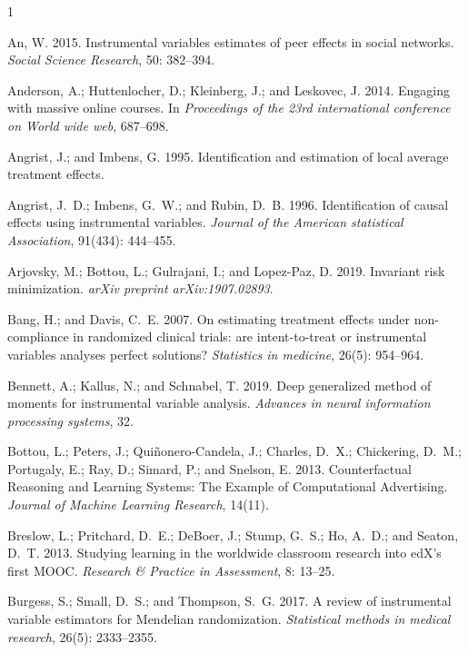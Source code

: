 \documentclass[journal]{IEEEtran}
\begin{document}
\begin{thebibliography}{1}

An, W. 2015.
\newblock Instrumental variables estimates of peer effects in social networks.
\newblock \emph{Social Science Research}, 50: 382--394.

Anderson, A.; Huttenlocher, D.; Kleinberg, J.; and Leskovec, J. 2014.
\newblock Engaging with massive online courses.
\newblock In \emph{Proceedings of the 23rd international conference on World wide web}, 687--698.

Angrist, J.; and Imbens, G. 1995.
\newblock Identification and estimation of local average treatment effects.

Angrist, J.~D.; Imbens, G.~W.; and Rubin, D.~B. 1996.
\newblock Identification of causal effects using instrumental variables.
\newblock \emph{Journal of the American statistical Association}, 91(434): 444--455.

Arjovsky, M.; Bottou, L.; Gulrajani, I.; and Lopez-Paz, D. 2019.
\newblock Invariant risk minimization.
\newblock \emph{arXiv preprint arXiv:1907.02893}.

Bang, H.; and Davis, C.~E. 2007.
\newblock On estimating treatment effects under non-compliance in randomized clinical trials: are intent-to-treat or instrumental variables analyses perfect solutions?
\newblock \emph{Statistics in medicine}, 26(5): 954--964.

Bennett, A.; Kallus, N.; and Schnabel, T. 2019.
\newblock Deep generalized method of moments for instrumental variable analysis.
\newblock \emph{Advances in neural information processing systems}, 32.

Bottou, L.; Peters, J.; Qui{\~n}onero-Candela, J.; Charles, D.~X.; Chickering, D.~M.; Portugaly, E.; Ray, D.; Simard, P.; and Snelson, E. 2013.
\newblock Counterfactual Reasoning and Learning Systems: The Example of Computational Advertising.
\newblock \emph{Journal of Machine Learning Research}, 14(11).

Breslow, L.; Pritchard, D.~E.; DeBoer, J.; Stump, G.~S.; Ho, A.~D.; and Seaton, D.~T. 2013.
\newblock Studying learning in the worldwide classroom research into edX's first MOOC.
\newblock \emph{Research \& Practice in Assessment}, 8: 13--25.

Burgess, S.; Small, D.~S.; and Thompson, S.~G. 2017.
\newblock A review of instrumental variable estimators for Mendelian randomization.
\newblock \emph{Statistical methods in medical research}, 26(5): 2333--2355.


\end{thebibliography}
\end{document}
